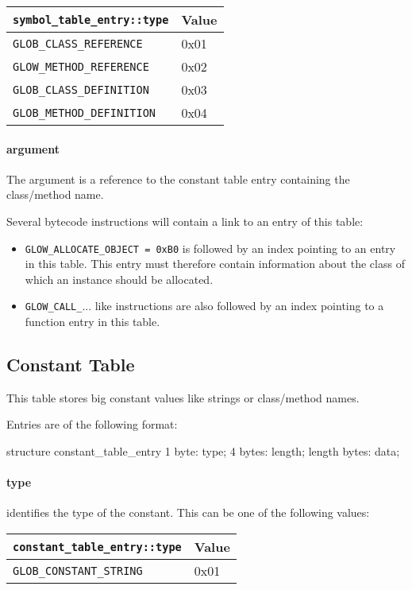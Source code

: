 \documentclass[12pt]{article}
\begin{document}
\begin{tabular}{| l | l |}
\hline
\verb|symbol_table_entry::type| & Value \\
\hline \hline
\verb|GLOB_CLASS_REFERENCE| & 0x01 \\
\hline
\verb|GLOW_METHOD_REFERENCE| & 0x02 \\
\hline
\verb|GLOB_CLASS_DEFINITION| & 0x03 \\
\hline
\verb|GLOB_METHOD_DEFINITION| & 0x04 \\
\hline
\end{tabular}

\paragraph{argument}
    The argument is a reference to the constant table entry containing the class/method name.

Several bytecode instructions will contain a link to an entry of this table:

\begin{itemize}
\item \verb|GLOW_ALLOCATE_OBJECT = 0xB0| is followed by an index pointing to an entry in this
    table. This entry must therefore contain information about the class of which an instance
    should be allocated.
\item \verb|GLOW_CALL_|... like instructions are also followed by an index pointing to a function
    entry in this table.
\end{itemize}

\subsection*{Constant Table}

This table stores big constant values like strings or class/method names.

Entries are of the following format:

\begin{code}[language=C]
structure constant_table_entry {
    1 byte:       type;
    4 bytes:      length;
    length bytes: data;
}
\end{code}

\paragraph{type} identifies the type of the constant. This can be one of the following values:

\begin{tabular}{| l | l |}
\hline
\verb|constant_table_entry::type| & Value \\
\hline \hline
\verb|GLOB_CONSTANT_STRING| & 0x01 \\
\hline
\end{tabular}
\end{document}
